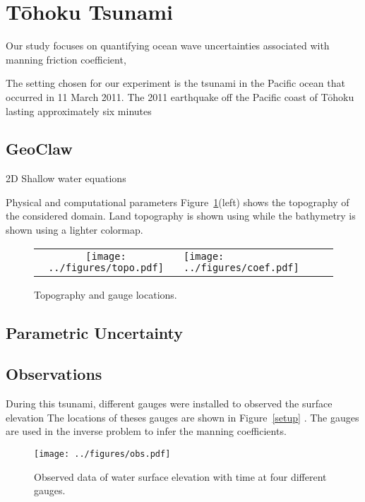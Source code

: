 \section{T\={o}hoku Tsunami}
Our study focuses on quantifying ocean wave uncertainties associated with 
manning friction coefficient, 

The setting chosen for our experiment is the tsunami in the Pacific ocean 
that occurred in 11 March 2011. The 2011 earthquake off the Pacific coast of Tōhoku lasting approximately six minutes


\subsection{GeoClaw}
2D Shallow water equations


Physical and computational parameters
Figure~\ref{fig:setup}(left) shows the topography of the considered domain.
Land topography is shown using while the bathymetry is shown using a lighter colormap.


\begin{figure}[h]
\centering
\begin{tabular}{clc}
\texttt{[image: ../figures/topo.pdf]}  &
\texttt{[image: ../figures/coef.pdf]} 
\label{setup}
\end{tabular}
\caption{Topography and gauge locations.}
\label{fig:setup}
\end{figure}
\subsection{Parametric Uncertainty}
\subsection{Observations}
During this tsunami, different gauges were installed to observed the surface elevation
The locations of theses gauges are shown in Figure~\ref{setup} .
The gauges are used in the inverse problem to infer the manning coefficients.

\begin{figure}[h]      
\centering
\texttt{[image: ../figures/obs.pdf]}
\caption{Observed data of water surface elevation with time at four different gauges.}
\label{fig:obs}
\end{figure}     
